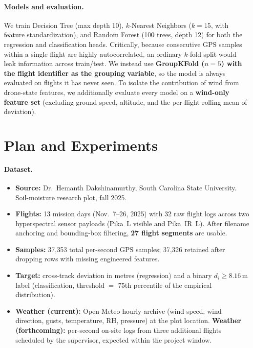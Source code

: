 \documentclass[10pt]{article}
\begin{document}
\paragraph{Models and evaluation.} We train Decision Tree (max depth 10), $k$-Nearest Neighbors ($k\!=\!15$, with feature standardization), and Random Forest (100 trees, depth 12) for both the regression and classification heads. Critically, because consecutive GPS samples within a single flight are highly autocorrelated, an ordinary $k$-fold split would leak information across train/test. We instead use \textbf{GroupKFold ($n\!=\!5$) with the flight identifier as the grouping variable}, so the model is always evaluated on flights it has never seen. To isolate the contribution of wind from drone-state features, we additionally evaluate every model on a \textbf{wind-only feature set} (excluding ground speed, altitude, and the per-flight rolling mean of deviation).

\section{Plan and Experiments}

\paragraph{Dataset.}
\begin{itemize}
  \item \textbf{Source:} Dr.\ Hemanth Dakshinamurthy, South Carolina State University. Soil-moisture research plot, fall 2025.
  \item \textbf{Flights:} 13 mission days (Nov.~7--26, 2025) with 32 raw flight logs across two hyperspectral sensor payloads (Pika~L visible and Pika~IR~L). After filename anchoring and bounding-box filtering, \textbf{27 flight segments} are usable.
  \item \textbf{Samples:} 37{,}353 total per-second GPS samples; 37{,}326 retained after dropping rows with missing engineered features.
  \item \textbf{Target:} cross-track deviation in metres (regression) and a binary $d_i \ge 8.16$\,m label (classification, threshold $=$ 75th percentile of the empirical distribution).
  \item \textbf{Weather (current):} Open-Meteo hourly archive (wind speed, wind direction, gusts, temperature, RH, pressure) at the plot location. \textbf{Weather (forthcoming):} per-second on-site logs from three additional flights scheduled by the supervisor, expected within the project window.
\end{itemize}
\end{document}
